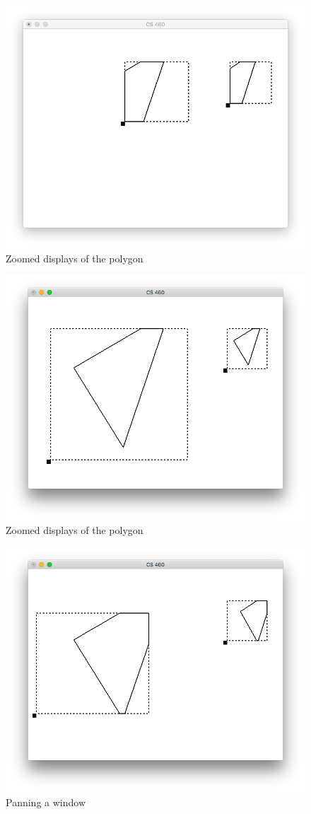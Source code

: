 \documentclass{article}
\begin{document}
\begin{figure}[htb]
\centering
\includegraphics[width=.9\linewidth]{./img/zoom_in.png}
\caption{Zoomed displays of the polygon}
\end{figure}
\begin{figure}[htb]
\centering
\includegraphics[width=.9\linewidth]{./img/zoom_out.png}
\caption{Zoomed displays of the polygon}
\end{figure}
\begin{figure}[htb]
\centering
\includegraphics[width=.9\linewidth]{./img/pan.png}
\caption{Panning a window}
\end{figure}
\end{document}
